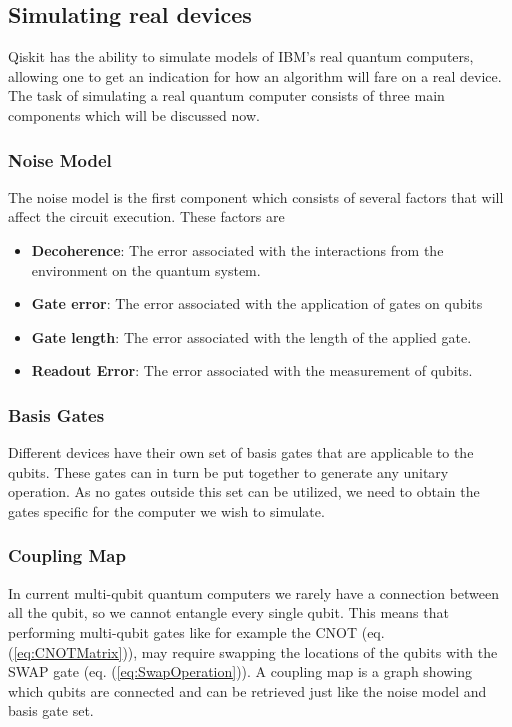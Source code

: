 \subsection{Simulating real devices}
\label{subsec:QiskitNoiseModels}
Qiskit has the ability to simulate models of IBM's real quantum computers, allowing one to get an indication for how an algorithm will fare on a real device. The task of simulating a real quantum computer consists of three main components which will be discussed now.

\subsubsection{Noise Model}
\label{subsubsec:NoiseModel}
The noise model is the first component which consists of several factors that will affect the circuit execution. These factors are
\begin{itemize}
  \item \textbf{Decoherence}: The error associated with the interactions from the environment on the quantum system.
  \item \textbf{Gate error}: The error associated with the application of gates on qubits
  \item \textbf{Gate length}: The error associated with the length of the applied gate.
  \item \textbf{Readout Error}: The error associated with the measurement of qubits.
\end{itemize}


\subsubsection{Basis Gates}
\label{subsubsec:BasisGates}
Different devices have their own set of basis gates that are applicable to the qubits. These gates can in turn be put together to generate any unitary operation. As no gates outside this set can be utilized, we need to obtain the gates specific for the computer we wish to simulate.

\subsubsection{Coupling Map}
\label{subsubsec:CouplingMap}
In current multi-qubit quantum computers we rarely have a connection between all the qubit, so we cannot entangle every single qubit. This means that performing multi-qubit gates like for example the CNOT (eq. (\ref{eq:CNOTMatrix})), may require swapping the locations of the qubits with the SWAP gate (eq. (\ref{eq:SwapOperation})). A coupling map is a graph showing which qubits are connected and can be retrieved just like the noise model and basis gate set.

